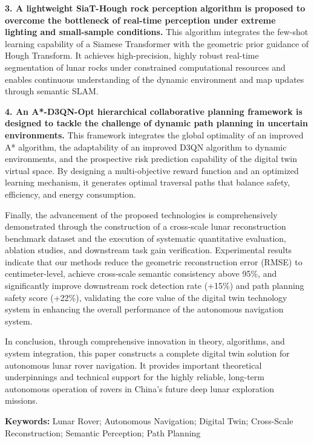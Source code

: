 \textbf{3. A lightweight SiaT-Hough rock perception algorithm is proposed to overcome the bottleneck of real-time perception under extreme lighting and small-sample conditions.} This algorithm integrates the few-shot learning capability of a Siamese Transformer with the geometric prior guidance of Hough Transform. It achieves high-precision, highly robust real-time segmentation of lunar rocks under constrained computational resources and enables continuous understanding of the dynamic environment and map updates through semantic SLAM.

\textbf{4. An A*-D3QN-Opt hierarchical collaborative planning framework is designed to tackle the challenge of dynamic path planning in uncertain environments.} This framework integrates the global optimality of an improved A* algorithm, the adaptability of an improved D3QN algorithm to dynamic environments, and the prospective risk prediction capability of the digital twin virtual space. By designing a multi-objective reward function and an optimized learning mechanism, it generates optimal traversal paths that balance safety, efficiency, and energy consumption.

Finally, the advancement of the proposed technologies is comprehensively demonstrated through the construction of a cross-scale lunar reconstruction benchmark dataset and the execution of systematic quantitative evaluation, ablation studies, and downstream task gain verification. Experimental results indicate that our methods reduce the geometric reconstruction error (RMSE) to centimeter-level, achieve cross-scale semantic consistency above 95\%, and significantly improve downstream rock detection rate (+15\%) and path planning safety score (+22\%), validating the core value of the digital twin technology system in enhancing the overall performance of the autonomous navigation system.

In conclusion, through comprehensive innovation in theory, algorithms, and system integration, this paper constructs a complete digital twin solution for autonomous lunar rover navigation. It provides important theoretical underpinnings and technical support for the highly reliable, long-term autonomous operation of rovers in China's future deep lunar exploration missions.

\vspace{0.5\baselineskip}

\noindent\textbf{Keywords:} Lunar Rover; Autonomous Navigation; Digital Twin; Cross-Scale Reconstruction; Semantic Perception; Path Planning

\thispagestyle{frontpage}

\newpage
